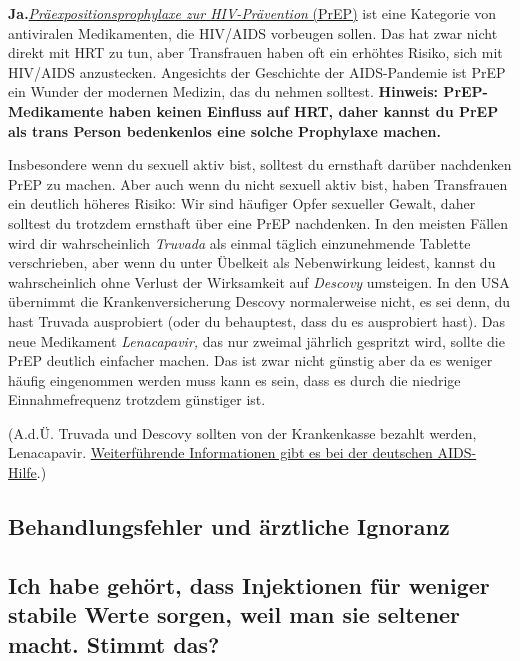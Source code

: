 \documentclass{article}
\begin{document}
\textbf{Ja.}\href{https://de.wikipedia.org/wiki/Pr%C3%A4expositionsprophylaxe}{\textit{Präexpositionsprophylaxe zur HIV-Prävention} (PrEP)} ist eine Kategorie von antiviralen Medikamenten, die HIV/AIDS vorbeugen sollen. Das hat zwar nicht direkt mit HRT zu tun, aber Transfrauen haben oft ein erhöhtes Risiko, sich mit HIV/AIDS anzustecken. Angesichts der Geschichte der AIDS-Pandemie ist PrEP ein Wunder der modernen Medizin, das du nehmen solltest. \textbf{Hinweis: PrEP-Medikamente haben keinen Einfluss auf HRT, daher kannst du PrEP als trans Person bedenkenlos eine solche Prophylaxe machen.}

Insbesondere wenn du sexuell aktiv bist, solltest du ernsthaft darüber nachdenken PrEP zu machen. Aber auch wenn du nicht sexuell aktiv bist, haben Transfrauen ein deutlich höheres Risiko: Wir sind häufiger Opfer sexueller Gewalt, daher solltest du trotzdem ernsthaft über eine PrEP nachdenken. In den meisten Fällen wird dir wahrscheinlich \textit{Truvada} als einmal täglich einzunehmende Tablette verschrieben, aber wenn du unter Übelkeit als Nebenwirkung leidest, kannst du wahrscheinlich ohne Verlust der Wirksamkeit auf \textit{Descovy} umsteigen. In den USA übernimmt die Krankenversicherung Descovy normalerweise nicht, es sei denn, du hast Truvada ausprobiert (oder du behauptest, dass du es ausprobiert hast). Das neue Medikament \textit{Lenacapavir,} das nur zweimal jährlich gespritzt wird, sollte die PrEP deutlich einfacher machen. Das ist zwar nicht günstig aber da es weniger häufig eingenommen werden muss kann es sein, dass es durch die niedrige Einnahmefrequenz trotzdem günstiger ist.

(A.d.Ü. Truvada und Descovy sollten von der Krankenkasse bezahlt werden, Lenacapavir. \href{https://www.aidshilfe.de/de/hiv-prep/prep-praxen-finden-kosten}{Weiterführende Informationen gibt es bei der deutschen AIDS-Hilfe}.)

\subsection*{Behandlungsfehler und ärztliche Ignoranz}

\subsection{Ich habe gehört, dass Injektionen für weniger stabile Werte sorgen, weil man sie seltener macht. Stimmt das?}
																  
\end{document}
